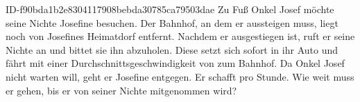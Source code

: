 \begin{exercise}
      {ID-f90bda1b2e8304117908bebda30785ca79503dae}
      {Zu Fuß}
  \ifproblem\problem
    Onkel Josef möchte seine Nichte Josefine besuchen.
    Der Bahnhof, an dem er aussteigen muss, liegt noch  von Josefines
    Heimatdorf entfernt. Nachdem er ausgestiegen ist, ruft er seine Nichte an und
    bittet sie ihn abzuholen. Diese setzt sich sofort in ihr Auto und fährt mit einer
    Durchschnittsgeschwindigkeit von  zum Bahnhof. Da Onkel Josef nicht
    warten will, geht er Josefine entgegen. Er schafft  pro Stunde. Wie
    weit muss er gehen, bis er von seiner Nichte mitgenommen wird?
  \fi
\end{exercise}
